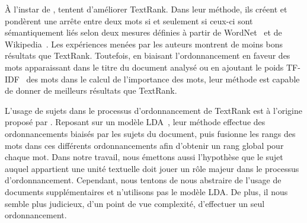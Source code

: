     À l'instar de ,
     tentent d'améliorer TextRank. Dans
    leur méthode, ils créent et pondèrent une arrête entre deux mots si et
    seulement si ceux-ci sont sémantiquement liés selon deux mesures définies à
    partir de WordNet~\cite{miller1995wordnet} et de
    Wikipedia~\cite{milne2008wikipediasemanticrelatedness}. Les expériences
    menées par les auteurs montrent de moins bons résultats que TextRank.
    Toutefois, en biaisant l'ordonnancement en faveur des mots apparaissant dans
    le titre du document analysé ou en ajoutant le poids
    TF-IDF~\cite{jones1972tfidf} des mots dans le calcul de l'importance des
    mots, leur méthode est capable de donner de meilleurs résultats que
    TextRank. 

    L'usage de sujets dans le processus d'ordonnancement de TextRank est à
    l'origine proposé par . Reposant sur un
    modèle LDA~\cite[Latent Dirichlet Allocation]{blei2003lda}, leur méthode
    effectue des ordonnancements biaisés par les sujets du document, puis
    fusionne les rangs des mots dans ces différents ordonnancements afin
    d'obtenir un rang global pour chaque mot. Dans notre travail, nous émettons
    aussi l'hypothèse que le sujet auquel appartient une unité textuelle doit
    jouer un rôle majeur dans le processus d'ordonnancement. Cependant, nous
    tentons de nous abstraire de l'usage de documents supplémentaires et
    n'utilisons pas le modèle LDA. De plus, il nous semble plus judicieux, d'un
    point de vue complexité, d'effectuer un seul ordonnancement.

